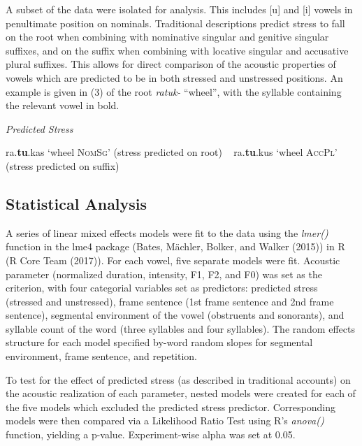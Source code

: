 \documentclass[english,man]{apa6}
\theoremstyle{definition}
\theoremstyle{definition}
\theoremstyle{definition}
\theoremstyle{remark}
\begin{document}
A subset of the data were isolated for analysis. This includes {[}u{]}
and {[}i{]} vowels in penultimate position on nominals. Traditional
descriptions predict stress to fall on the root when combining with
nominative singular and genitive singular suffixes, and on the suffix
when combining with locative singular and accusative plural suffixes.
This allows for direct comparison of the acoustic properties of vowels
which are predicted to be in both stressed and unstressed positions. An
example is given in (3) of the root \emph{ratuk-} \enquote{wheel}, with
the syllable containing the relevant vowel in bold.

\begin{exe}
\ex \textit{Predicted Stress} \
\begin{xlist}
\ex\label{ex1a} ra.\textbf{tu}.kas `wheel \textsc{NomSg}' (stress predicted on root) \
\ex\label{ex1b} ra.\textbf{tu}.kus `wheel \textsc{AccPl}' (stress predicted on suffix)
\end{xlist}
\end{exe}

\subsection{Statistical Analysis}\label{statistical-analysis}

A series of linear mixed effects models were fit to the data using the
\emph{lmer()} function in the lme4 package (Bates, Mächler, Bolker, and
Walker (2015)) in R (R Core Team (2017)). For each vowel, five separate
models were fit. Acoustic parameter (normalized duration, intensity, F1,
F2, and F0) was set as the criterion, with four categorial variables set
as predictors: predicted stress (stressed and unstressed), frame
sentence (1st frame sentence and 2nd frame sentence), segmental
environment of the vowel (obstruents and sonorants), and syllable count
of the word (three syllables and four syllables). The random effects
structure for each model specified by-word random slopes for segmental
environment, frame sentence, and repetition.

To test for the effect of predicted stress (as described in traditional
accounts) on the acoustic realization of each parameter, nested models
were created for each of the five models which excluded the predicted
stress predictor. Corresponding models were then compared via a
Likelihood Ratio Test using R's \emph{anova()} function, yielding a
p-value. Experiment-wise alpha was set at 0.05.
\end{document}
